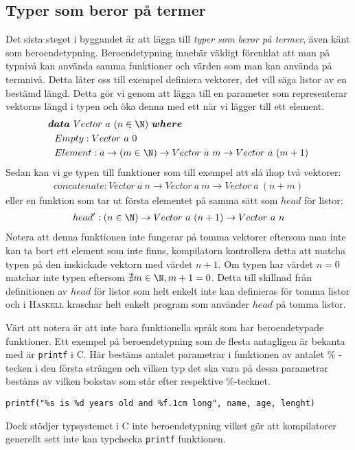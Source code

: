 \subsection{Typer som beror på termer}
Det sista steget i byggandet är att lägga till \emph{typer som beror på
termer}, även känt som beroendetypning. Beroendetypning innebär väldigt
förenklat att man på typnivå kan använda samma funktioner och värden som man
kan använda på termnivå. Detta låter oss till exempel definiera vektorer, det
vill säga listor av en bestämd längd. Detta gör vi genom att lägga till en
parameter som representerar vektorns längd i typen och öka denna med ett när vi
lägger till ett element.
\begin{align*}
  &\boldsymbol{data}\ Vector\ a\ (n \in \N)\ \boldsymbol{where} \\
  &\ \ Empty : Vector\ a\ 0 \\
  &\ \ Element : a \to (m \in \N) \to Vector\ a\ m \to Vector\ a\ (m+1)
\end{align*}
Sedan kan vi ge typen till funktioner som till exempel att slå ihop två
vektorer:
\begin{align*}
  concatenate : Vector\ a\ n \to Vector\ a\ m \to Vector\ a\ (n+m)
\end{align*}
eller en funktion som tar ut första elementet på samma sätt som $head$ för
listor:
\begin{align*}
  head' : (n \in \N) \to Vector\ a\ (n+1) \to Vector\ a\ n
\end{align*}
Notera att denna funktionen inte fungerar på tomma vektorer eftersom man inte
kan ta bort ett element som inte finns, kompilatorn kontrollera detta att
matcha typen på den inskickade vektorn med värdet $n+1$. Om typen har värdet
$n = 0$ matchar inte typen eftersom $\nexists m \in \N, m+1 = 0$. Detta till
skillnad från definitionen av $head$ för listor som helt enkelt inte kan
definieras för tomma listor och i \textsc{Haskell} kraschar helt enkelt program
som använder $head$ på tomma listor.

Värt att notera är att inte bara funktionella språk som har beroendetypade
funktioner. Ett exempel på beroendetypning som de flesta antagligen är bekanta
med är \texttt{printf} i \textsc{C}. Här bestäms antalet parametrar i funktionen
av antalet \% -tecken i den första strängen och vilken typ det ska vara på
dessa parametrar bestäms av vilken bokstav som står efter respektive
\%-tecknet.
\begin{verbatim}
printf("%s is %d years old and %f.1cm long", name, age, lenght)
\end{verbatim}
Dock stödjer typsystemet i \textsc{C} inte beroendetypning vilket gör att
kompilatorer generellt sett inte kan typchecka \texttt{printf} funktionen.

